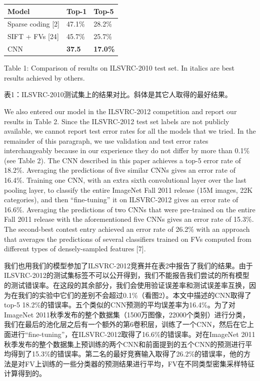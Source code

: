 \documentclass[12pt,a4paper,UTF8,twoside]{book}
\begin{document}
\begin{longtable}[]{@{}lll@{}}
\toprule
\textbf{Model} & \textbf{Top-1} & \textbf{Top-5}\tabularnewline
\midrule
\endhead
Sparse coding {[}2{]} & 47.1\% & 28.2\%\tabularnewline
SIFT + FVs {[}24{]} & 45.7\% & 25.7\%\tabularnewline
CNN & \textbf{37.5} & \textbf{17.0\%}\tabularnewline
\bottomrule
\end{longtable}

Table 1: Comparison of results on ILSVRC-2010 test set. In italics are best results achieved by others.

表1：ILSVRC-2010测试集上的结果对比。斜体是其它人取得的最好结果。

We also entered our model in the ILSVRC-2012 competition and report our results in Table 2. Since the ILSVRC-2012 test set labels are not publicly available, we cannot report test error rates for all the models that we tried. In the remainder of this paragraph, we use validation and test error rates interchangeably because in our experience they do not differ by more than 0.1\% (see Table 2). The CNN described in this paper achieves a top-5 error rate of 18.2\%. Averaging the predictions of five similar CNNs gives an error rate of 16.4\%. Training one CNN, with an extra sixth convolutional layer over the last pooling layer, to classify the entire ImageNet Fall 2011 release (15M images, 22K categories), and then ``fine-tuning'' it on ILSVRC-2012 gives an error rate of 16.6\%. Averaging the predictions of two CNNs that were pre-trained on the entire Fall 2011 release with the aforementioned five CNNs gives an error rate of 15.3\%. The second-best contest entry achieved an error rate of 26.2\% with an approach that averages the predictions of several classifiers trained on FVs computed from different types of densely-sampled features {[}7{]}.

我们也用我们的模型参加了ILSVRC-2012竞赛并在表2中报告了我们的结果。由于ILSVRC-2012的测试集标签不可以公开得到，我们不能报告我们尝试的所有模型的测试错误率。在这段的其余部分，我们会使用验证误差率和测试误差率互换，因为在我们的实验中它们的差别不会超过0.1\%（看图2）。本文中描述的CNN取得了top-5 18.2\%的错误率。五个类似的CNN预测的平均误差率为16.4\%。为了对ImageNet 2011秋季发布的整个数据集（1500万图像，22000个类别）进行分类，我们在最后的池化层之后有一个额外的第6卷积层，训练了一个CNN，然后在它上面进行``fine-tuning''，在ILSVRC-2012取得了16.6\%的错误率。对在ImageNet 2011秋季发布的整个数据集上预训练的两个CNN和前面提到的五个CNN的预测进行平均得到了15.3\%的错误率。第二名的最好竞赛输入取得了26.2\%的错误率，他的方法是对FV上训练的一些分类器的预测结果进行平均，FV在不同类型密集采样特征计算得到的。
\end{document}
